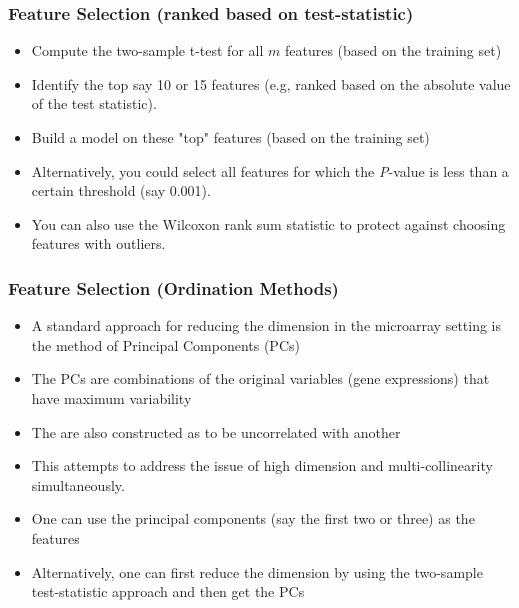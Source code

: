 \documentclass[xcolor=x11names,compress]{beamer}\usepackage[]{graphicx}\usepackage[]{color}
\begin{document}
\begin{frame}
  \frametitle{Feature Selection (ranked based on test-statistic)}
  \begin{itemize}
\item Compute the two-sample t-test for all $m$ features (based on the training set) 
\item Identify the top say 10 or 15 features (e.g, ranked
      based on the absolute value of the test statistic).
\item Build a model on these "top" features (based on the training set) 
\item Alternatively, you could select all features for which the {\it P}-value is less
      than a certain threshold (say 0.001).
\item You can also use the Wilcoxon rank sum statistic to protect against choosing features
      with outliers.
\end{itemize}
\end{frame}





\begin{frame}
  \frametitle{Feature Selection (Ordination Methods)}
  \begin{itemize}
\item A standard approach for reducing the dimension in the microarray setting
      is the method of Principal Components (PCs)
\item The PCs are combinations of the original variables (gene expressions) that have maximum variability
\item The are also constructed as to be uncorrelated with another
\item This attempts to address the issue of high dimension and multi-collinearity simultaneously.
\item One can use the principal components (say the first two or three) as the features
\item Alternatively, one can first reduce the dimension by using the two-sample test-statistic approach
      and then get the PCs
\end{itemize}
\end{frame}
\end{document}
